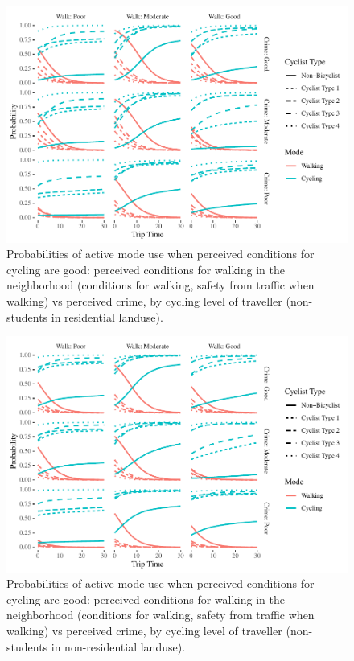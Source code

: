 \documentclass[]{elsarticle} %
\makeatletter
\def\maxwidth{\ifdim\Gin@nat@width>\linewidth\linewidth
\else\Gin@nat@width\fi}
\let\Oldincludegraphics\includegraphics
\renewcommand{\includegraphics}[1]{\Oldincludegraphics[width=\maxwidth]{#1}}
\makeatother
\begin{document}
\begin{figure}
\centering
\includegraphics{Active-Travel-in-Bangladesh_files/figure-latex/figure-probabilities-perceptions-walking-active-non-students-residential-1.pdf}
\caption{\label{fig:probabilities-perceptions-walking-active-modes-non-students-residential}Probabilities
of active mode use when perceived conditions for cycling are good:
perceived conditions for walking in the neighborhood (conditions for
walking, safety from traffic when walking) vs perceived crime, by
cycling level of traveller (non-students in residential landuse).}
\end{figure}

\begin{figure}
\centering
\includegraphics{Active-Travel-in-Bangladesh_files/figure-latex/figure-probabilities-perceptions-walking-active-non-students-non-residential-1.pdf}
\caption{\label{fig:probabilities-perceptions-walking-active-modes-non-students-non-residential}Probabilities
of active mode use when perceived conditions for cycling are good:
perceived conditions for walking in the neighborhood (conditions for
walking, safety from traffic when walking) vs perceived crime, by
cycling level of traveller (non-students in non-residential landuse).}
\end{figure}
\end{document}
